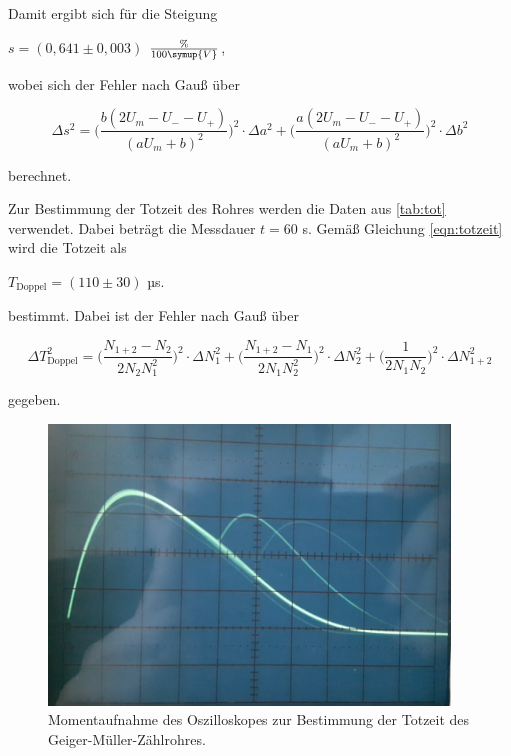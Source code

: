 Damit ergibt sich für die Steigung

\begin{center}
    $s = (0,641 \pm 0,003)$ $\frac{\%}{100\symup{V}}$,
\end{center}

wobei sich der Fehler nach Gauß über

\begin{equation}
    \Delta s^2 = \bigg( \dfrac{b\left(2 U_m - U_- -U_+ \right)}{\left(a U_m + b \right)^2} \bigg)^2 \cdot \Delta a^2 + \bigg( \dfrac{a\left(2U_m - U_- - U_+ \right)}{\left(a U_m + b \right)^2} \bigg)^2 \cdot \Delta b^2
\end{equation}

berechnet.




Zur Bestimmung der Totzeit des Rohres werden die Daten aus \autoref{tab:tot} verwendet.
Dabei beträgt die Messdauer $t = 60$ s.
Gemäß Gleichung \eqref{eqn:totzeit} wird die Totzeit als

\begin{center}
    $T_\text{Doppel} = (110 \pm 30)$ µs.
\end{center}

bestimmt. Dabei ist der Fehler nach Gauß über

\begin{equation}
    \Delta T_\text{Doppel}^2 = \bigg( \dfrac{N_{1+2} - N_2}{2 N_2 N_1^2} \bigg)^2 \cdot \Delta N_1^2 + \bigg( \dfrac{N_{1+2} - N_1}{2 N_1 N_2^2}  \bigg)^2 \cdot \Delta N_2^2 + \bigg( \dfrac{1}{2 N_1 N_2} \bigg)^2 \cdot \Delta N_{1+2}^2
\end{equation}

gegeben.

\begin{figure}
  \centering
  \includegraphics[width=0.95\textwidth]{content/osz.png}
  \caption{Momentaufnahme des Oszilloskopes zur Bestimmung der Totzeit des Geiger-Müller-Zählrohres.}
  \label{fig:osz}
\end{figure}

